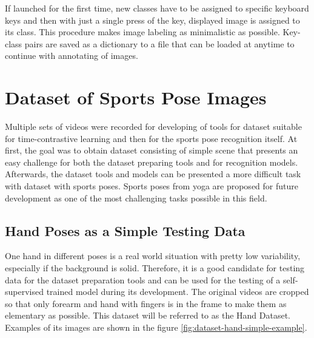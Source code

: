If launched for the first time, new classes have to be assigned to specific keyboard keys and then with just a single press of the key, displayed image is assigned to its class. This procedure makes image labeling as minimalistic as possible. Key-class pairs are saved as a dictionary to a file that can be loaded at anytime to continue with annotating of images.

\section{\label{sec:dataset-sports-poses}Dataset of Sports Pose Images}

Multiple sets of videos were recorded for developing of tools for dataset suitable for time-contrastive learning and then for the sports pose recognition itself. At first, the goal was to obtain dataset consisting of simple scene that presents an easy challenge for both the dataset preparing tools and for recognition models. Afterwards, the dataset tools and models can be presented a more difficult task with dataset with sports poses. Sports poses from yoga are proposed for future development as one of the most challenging tasks possible in this field.

\subsection{\label{sec:dataset-hand}Hand Poses as a Simple Testing Data}

One hand in different poses is a real world situation with pretty low variability, especially if the background is solid. Therefore, it is a good candidate for testing data for the dataset preparation tools and can be used for the testing of a self-supervised trained model during its development. The original videos are cropped so that only forearm and hand with fingers is in the frame to make them as elementary as possible. This dataset will be referred to as the Hand Dataset. Examples of its images are shown in the figure \ref{fig:dataset-hand-simple-example}.

